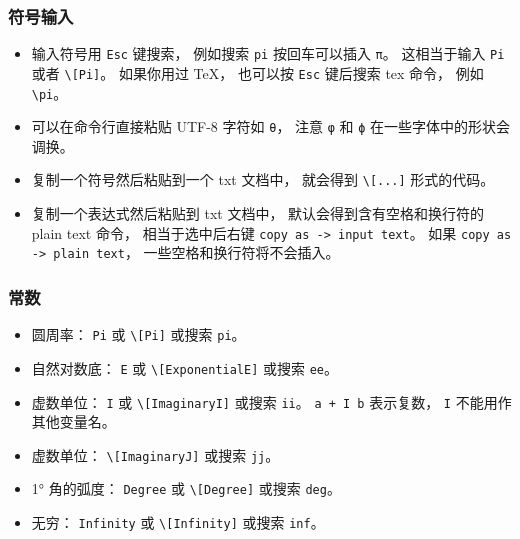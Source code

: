\subsubsection{符号输入}
\begin{itemize}
\item 输入符号用 \verb|Esc| 键搜索， 例如搜索 \verb|pi| 按回车可以插入 \verb|π|。 这相当于输入 \verb|Pi| 或者 \verb|\[Pi]|。 如果你用过 TeX， 也可以按 \verb|Esc| 键后搜索 tex 命令， 例如 \verb|\pi|。
\item 可以在命令行直接粘贴 UTF-8 字符如 \verb|θ|， 注意 \verb|φ| 和 \verb|ϕ| 在一些字体中的形状会调换。
\item 复制一个符号然后粘贴到一个 txt 文档中， 就会得到 \verb|\[...]| 形式的代码。
\item 复制一个表达式然后粘贴到 txt 文档中， 默认会得到含有空格和换行符的 plain text 命令， 相当于选中后右键 \verb|copy as -> input text|。 如果 \verb|copy as -> plain text|， 一些空格和换行符将不会插入。
\end{itemize}

\subsubsection{常数}

\begin{itemize}
\item 圆周率： \verb|Pi| 或 \verb|\[Pi]| 或搜索 \verb|pi|。
\item 自然对数底： \verb|E| 或 \verb|\[ExponentialE]| 或搜索 \verb|ee|。
\item 虚数单位： \verb|I| 或 \verb|\[ImaginaryI]| 或搜索 \verb|ii|。 \verb|a + I b| 表示复数， \verb|I| 不能用作其他变量名。
\item 虚数单位： \verb|\[ImaginaryJ]| 或搜索 \verb|jj|。
\item 1° 角的弧度： \verb|Degree| 或 \verb|\[Degree]| 或搜索 \verb|deg|。
\item 无穷： \verb|Infinity| 或 \verb|\[Infinity]| 或搜索 \verb|inf|。
\end{itemize}

